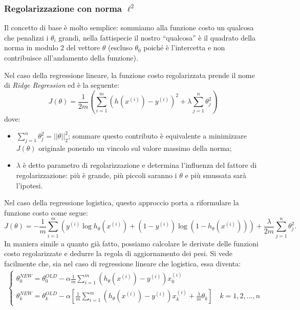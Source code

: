 \subsubsection{Regolarizzazione con norma $\ell^2$}\label{sec:regolarizzazione_l2}

Il concetto di base è molto semplice: sommiamo alla funzione costo un qualcosa che penalizzi i $\theta_i$ grandi, nella fattispecie il nostro ``qualcosa'' è il quadrato della norma in modulo 2 del vettore 
 $\theta$ (escluso $\theta_0$ poiché è l'intercetta e non contribuisce all'andamento della funzione).

Nel caso della regressione lineare, la funzione costo regolarizzata prende il nome di \emph{Ridge Regression} ed è la seguente:
\begin{equation}\label{eqJ_theta}
  J(\theta) = \frac{1}{2m} \left(\sum_{i=1}^m (h(x^{(i)})-y^{(i)})^2 + \lambda \sum_{j=1}^n\theta_j^2\right)
\end{equation}
dove:
\begin{itemize}
\item $\sum_{j=1}^n\theta_j^2 = ||\theta||_2^2$; sommare questo contributo è equivalente a minimizzare $J(\theta)$ originale ponendo un vincolo sul valore massimo della norma;
\item $\lambda$ è detto parametro di regolarizzazione e determina l'influenza del fattore di regolarizzazione: più è grande, più piccoli saranno i $\theta$ e più smussata sarà l'ipotesi.
\end{itemize}
Nel caso della regressione logistica, questo approccio porta a riformulare la funzione costo come segue:
 \begin{equation*}
 J(\theta) = -\frac{1}{m}\sum_{i=1}^m \left( {y^{(i)}}\log{h_\theta(x^{(i)})} + (1-y^{(i)})
 \log{(1 - h_\theta(x^{(i)}))} \right) + \frac{\lambda}{2m}\sum_{j=1}^n\theta_j^2.
\end{equation*}
In maniera simile a quanto già fatto, possiamo calcolare le derivate delle funzioni costo regolarizzate e dedurre la regola di aggiornamento dei pesi. Si vede facilmente che, sia nel caso di regressione lineare che logistica, essa diventa:
\begin{gather*}\begin{cases}
\displaystyle\theta^{NEW}_0 = \theta^{OLD}_0 - \alpha \frac{1}{m} \sum_{i=1}^m \left(h_\theta(x^{(i)}) - y^{(i)}\right)x_0^{(i)} \\
\displaystyle\theta^{NEW}_k = \theta^{OLD}_k - \alpha \left[ \frac{1}{m} \sum_{i=1}^m \left(h_\theta(x^{(i)}) - y^{(i)}\right)x_k^{(i)}+\frac{\lambda}{m}\theta_k\right] \quad k=1,2,\dots,n
\end{cases}
\end{gather*}
